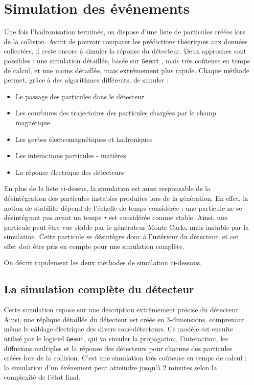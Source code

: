 \section{Simulation des événements}

Une fois l'hadronisation terminée, on dispose d'une liste de particules créées lors de la collision. Avant de pouvoir comparer les prédictions théoriques aux données collectées, il reste encore à simuler la réponse du détecteur. Deux approches sont possibles : une simulation détaillée, basée sur \texttt{Geant} \citep{Agostinelli2003250}, mais très coûteuse en temps de calcul, et une moins détaillée, mais extrêmement plus rapide. Chaque méthode permet, grâce à des algorithmes différents, de simuler :
\begin{itemize}
    \item Le passage des particules dans le détecteur
    \item Les courbures des trajectoires des particules chargées par le champ magnétique
    \item Les gerbes électromagnétiques et hadroniques
    \item Les interactions particules - matières
    \item La réponse électrique des détecteurs
\end{itemize}

En plus de la liste ci-dessus, la simulation est aussi responsable de la désintégration des particules instables produites lors de la génération. En effet, la notion de stabilité dépend de l'échelle de temps considérée : une particule ne se désintégrant pas avant un temps $\tau$ est considérée comme stable. Ainsi, une particule peut être vue stable par le générateur Monte Carlo, mais instable par la simulation. Cette particule se désintègre donc à l'intérieur du détecteur, et cet effet doit être pris en compte pour une simulation complète.

\medskip

On décrit rapidement les deux méthodes de simulation ci-dessous.

\subsection{La simulation complète du détecteur}

Cette simulation repose sur une description extrêmement précise du détecteur. Ainsi, une réplique détaillée du détecteur est créée en 3-dimensions, comprenant même le câblage électrique des divers sous-détecteurs. Ce modèle est ensuite utilisé par le logiciel \texttt{Geant}, qui va simuler la propagation, l'interaction, les diffusions multiples et la réponse des détecteurs pour chacune des particules créées lors de la collision. C'est une simulation très coûteuse en temps de calcul : la simulation d'un événement peut atteindre jusqu'à 2 minutes selon la complexité de l'état final.

